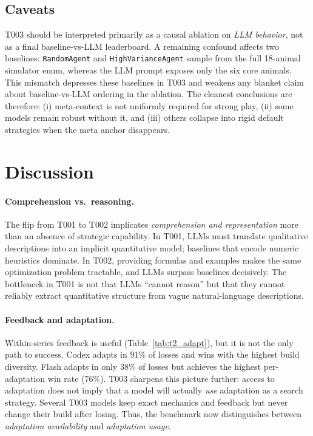 \documentclass[11pt]{article}
\newcommand{\tOne}{T001}
\newcommand{\tTwo}{T002}
\newcommand{\tThree}{T003}
\begin{document}
\subsection{Caveats}

\tThree{} should be interpreted primarily as a causal ablation on \emph{LLM behavior}, not as a final baseline-vs-LLM leaderboard.
A remaining confound affects two baselines:
\texttt{RandomAgent} and \texttt{HighVarianceAgent} sample from the full 18-animal simulator enum, whereas the LLM prompt exposes only the six core animals.
This mismatch depresses these baselines in \tThree{} and weakens any blanket claim about baseline-vs-LLM ordering in the ablation.
The cleanest conclusions are therefore:
(i) meta-context is not uniformly required for strong play,
(ii) some models remain robust without it,
and (iii) others collapse into rigid default strategies when the meta anchor disappears.

\section{Discussion}

\paragraph{Comprehension vs.\ reasoning.}
The flip from \tOne{} to \tTwo{} implicates \emph{comprehension and representation} more than an absence of strategic capability.
In \tOne, LLMs must translate qualitative descriptions into an implicit quantitative model; baselines that encode numeric heuristics dominate.
In \tTwo, providing formulas and examples makes the same optimization problem tractable, and LLMs surpass baselines decisively.
The bottleneck in \tOne{} is not that LLMs ``cannot reason'' but that they cannot reliably extract quantitative structure from vague natural-language descriptions.

\paragraph{Feedback and adaptation.}
Within-series feedback is useful (Table~\ref{tab:t2_adapt}), but it is not the only path to success.
Codex adapts in 91\% of losses and wins with the highest build diversity.
Flash adapts in only 38\% of losses but achieves the highest per-adaptation win rate (76\%).
\tThree{} sharpens this picture further: access to adaptation does not imply that a model will actually \emph{use} adaptation as a search strategy.
Several \tThree{} models keep exact mechanics and feedback but never change their build after losing.
Thus, the benchmark now distinguishes between \emph{adaptation availability} and \emph{adaptation usage}.
\end{document}
